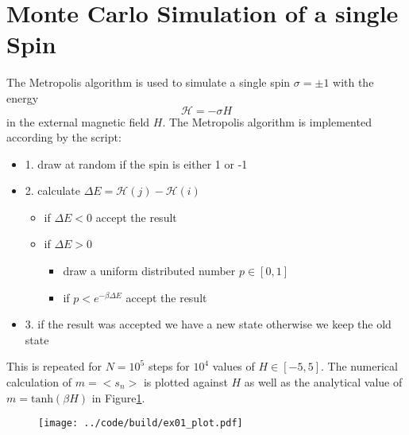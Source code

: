 \section{Monte Carlo Simulation of a single Spin}

The Metropolis algorithm is used to simulate a single spin $\sigma = \pm 1$ with the energy
\begin{equation}
\mathcal{H} = - \sigma H 
\end{equation}
in the external magnetic field $H$.
The Metropolis algorithm is implemented according by the script:
\begin{itemize}
\item 1. draw at random if the spin is either 1 or -1
\item 2. calculate $\Delta E = \mathcal{H}(j) - \mathcal{H}(i)$
    \begin{itemize}
        \item if $\Delta E < 0$ accept the result
        \item if $\Delta E > 0$
            \begin{itemize}
            \item draw a uniform distributed number $p \in [0,1]$
            \item if $p < e^{-\beta \Delta E}$ accept the result
            \end{itemize}
    \end{itemize}
\item 3. if the result was accepted we have a new state otherwise we keep the old state    
\end{itemize}
This is repeated for $N = 10^5$ steps for $10^4$ values of $H \in [-5,5]$.
The numerical calculation of $m = <s_n> $ is plotted  against $H$ as well as the analytical value of $m = \text{tanh}(\beta H)$ in Figure\ref{fig:1}.

\begin{figure}[h]
    \centering
    \texttt{[image: ../code/build/ex01\_plot.pdf]}
    \label{fig:1}
\end{figure}
